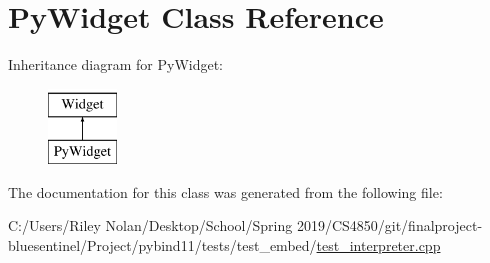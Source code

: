 \hypertarget{class_py_widget}{}\section{Py\+Widget Class Reference}
\label{class_py_widget}
Inheritance diagram for Py\+Widget\+:\begin{figure}[H]
\begin{center}
\leavevmode
\includegraphics[height=2.000000cm]{class_py_widget}
\end{center}
\end{figure}


The documentation for this class was generated from the following file\+:\begin{DoxyCompactItemize}
\item 
C\+:/\+Users/\+Riley Nolan/\+Desktop/\+School/\+Spring 2019/\+C\+S4850/git/finalproject-\/bluesentinel/\+Project/pybind11/tests/test\+\_\+embed/\mbox{\hyperlink{test__interpreter_8cpp}{test\+\_\+interpreter.\+cpp}}\end{DoxyCompactItemize}
